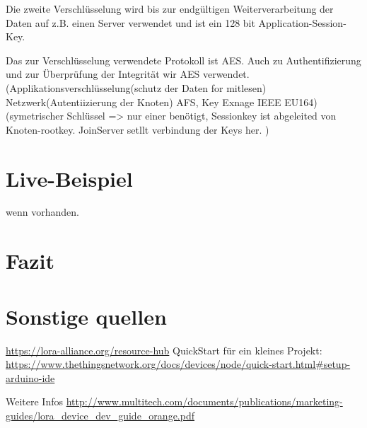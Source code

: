 \documentclass[a4paper,12pt]{article}
\begin{document}
    Die zweite Verschlüsselung wird bis zur endgültigen Weiterverarbeitung der Daten auf z.B. einen Server verwendet und ist ein 128 bit Application-Session-Key.

    Das zur Verschlüsselung verwendete Protokoll ist AES. Auch zu Authentifizierung und zur Überprüfung der Integrität wir AES verwendet.
    \cite{LoRaSecur}
        \cite{RFC8376}
        \cite{WhatIsLoRa}(Applikationsverschlüsselung(schutz der Daten for mitlesen) Netzwerk(Autentiizierung der Knoten) AFS, Key Exnage IEEE EU164)
        \cite{LoRaSpec}(symetrischer Schlüssel => nur einer benötigt, Sessionkey ist abgeleited von Knoten-rootkey. JoinServer setllt verbindung der Keys her.
        )
    \section{Live-Beispiel}
    wenn vorhanden.

    \section{Fazit}
    \section{Sonstige quellen}
    \url{https://lora-alliance.org/resource-hub}
    QuickStart für ein kleines Projekt: \url{https://www.thethingsnetwork.org/docs/devices/node/quick-start.html#setup-arduino-ide}

    Weitere Infos \url{http://www.multitech.com/documents/publications/marketing-guides/lora_device_dev_guide_orange.pdf}
    \newpage
    
    
\end{document}
